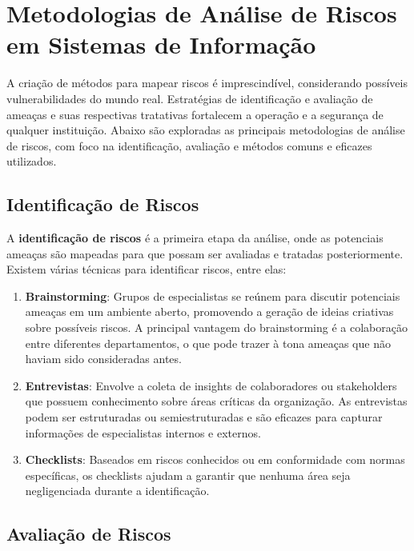 \documentclass[12pt,oneside,a4paper,article]{abntex2}
\begin{document}

\newpage

\section {\textbf{Metodologias de Análise de Riscos em Sistemas de Informação}}

A criação de métodos para mapear riscos é imprescindível, considerando possíveis vulnerabilidades do mundo real. Estratégias de identificação e avaliação de ameaças e suas respectivas tratativas fortalecem a operação e a segurança de qualquer instituição. Abaixo são exploradas as principais metodologias de análise de riscos, com foco na identificação, avaliação e métodos comuns e eficazes utilizados.

\subsection{\textbf{Identificação de Riscos}}

A \textbf{identificação de riscos} é a primeira etapa da análise, onde as potenciais ameaças são mapeadas para que possam ser avaliadas e tratadas posteriormente. Existem várias técnicas para identificar riscos, entre elas:

\begin{enumerate}
    \item \textbf{Brainstorming}: Grupos de especialistas se reúnem para discutir potenciais ameaças em um ambiente aberto, promovendo a geração de ideias criativas sobre possíveis riscos. A principal vantagem do brainstorming é a colaboração entre diferentes departamentos, o que pode trazer à tona ameaças que não haviam sido consideradas antes.
    
    \item \textbf{Entrevistas}: Envolve a coleta de insights de colaboradores ou stakeholders que possuem conhecimento sobre áreas críticas da organização. As entrevistas podem ser estruturadas ou semiestruturadas e são eficazes para capturar informações de especialistas internos e externos.
    
    \item \textbf{Checklists}: Baseados em riscos conhecidos ou em conformidade com normas específicas, os checklists ajudam a garantir que nenhuma área seja negligenciada durante a identificação.
\end{enumerate}

\subsection{\textbf{Avaliação de Riscos}}
\end{document}
